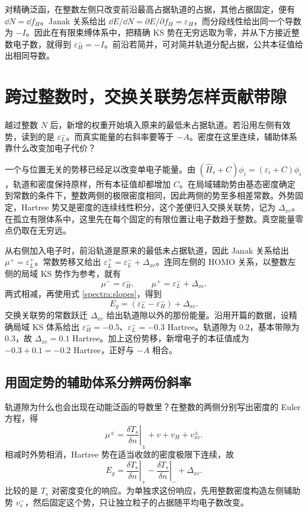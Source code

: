 对精确泛函，在整数左侧只改变前沿最高占据轨道的占据，其他占据固定，便有 $\dd N=\dd f_H$。Janak 关系给出 $\dd E/\dd N=\partial E/\partial f_H=\varepsilon_H$，而分段线性给出同一个导数为 $-I$。因此在有限束缚体系中，把精确 KS 势在无穷远取为零，并从下方接近整数电子数，就得到 $\varepsilon_H^-=-I$。前沿若简并，可对简并轨道分配占据，公共本征值给出相同导数。

\section{跨过整数时，交换关联势怎样贡献带隙}
越过整数 $N$ 后，新增的权重开始填入原来的最低未占据轨道。若沿用左侧有效势，读到的是 $\varepsilon_L^-$。而真实能量的右斜率要等于 $-A$。密度在这里连续，辅助体系靠什么改变加电子代价？

一个与位置无关的势移已经足以改变单电子能量。由 $(\hat H_s+C)\phi_i=(\varepsilon_i+C)\phi_i$，轨道和密度保持原样，所有本征值却都增加 $C$。在局域辅助势由基态密度确定到常数的条件下，整数两侧的极限密度相同，因此两侧的势至多相差常数。外势固定，Hartree 势又是密度的连续线性积分，这个差便归入交换关联势，记为 $\Delta_{xc}$。在孤立有限体系中，这里先在每个固定的有限位置让电子数趋于整数。真空能量零点仍取在无穷远。

从右侧加入电子时，前沿轨道是原来的最低未占据轨道，因此 Janak 关系给出 $\mu^+=\varepsilon_L^+$。常数势移又给出 $\varepsilon_L^+=\varepsilon_L^-+\Delta_{xc}$。连同左侧的 HOMO 关系，以整数左侧的局域 KS 势作为参考，就有
\begin{equation}
\mu^-=\varepsilon_H^-,\qquad
\mu^+=\varepsilon_L^-+\Delta_{xc}.
\end{equation}
两式相减，再使用式 \eqref{spectra:slopes}，得到
\begin{equation}\label{spectra:discontinuity}
E_g=(\varepsilon_L^--\varepsilon_H^-)+\Delta_{xc}.
\end{equation}
交换关联势的常数跃迁 $\Delta_{xc}$ 给出轨道隙以外的那份能量。沿用开篇的数据，设精确局域 KS 体系给出 $\varepsilon_H^-=-0.5$、$\varepsilon_L^-=-0.3$ Hartree。轨道隙为 $0.2$，基本带隙为 $0.3$，故 $\Delta_{xc}=0.1$ Hartree。加上这份势移，新增电子的本征值成为 $-0.3+0.1=-0.2$ Hartree，正好与 $-A$ 相合。

\subsection{用固定势的辅助体系分辨两份斜率}
轨道隙为什么也会出现在动能泛函的导数里？在整数的两侧分别写出密度的 Euler 方程，得
\begin{equation}
\mu^\pm=\left.\frac{\delta T_s}{\delta n}\right|_\pm
+v+v_H+v_{xc}^\pm.
\end{equation}
相减时外势相消，Hartree 势在适当收敛的密度极限下连续，故
\begin{equation}
E_g=\left.\frac{\delta T_s}{\delta n}\right|_+
-\left.\frac{\delta T_s}{\delta n}\right|_-+\Delta_{xc}.
\end{equation}
比较的是 $T_s$ 对密度变化的响应。为单独求这份响应，先用整数密度构造左侧辅助势 $v_s^-$，然后固定这个势，只让独立粒子的占据随平均电子数改变。

